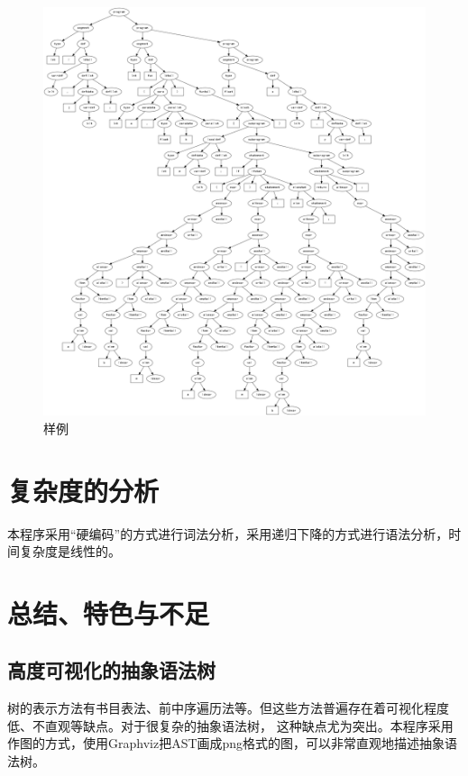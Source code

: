 \documentclass[supercite]{Experimental_Report}
\theoremstyle{definition}
\begin{document}
\newpage
\begin{figure}[htb]
	\begin{center}
		\includegraphics[scale=0.2]{images/样例.png}
		\caption{样例}
		\label{fig3-7}
	\end{center}
\end{figure}
\newpage
\section{复杂度的分析}
本程序采用“硬编码”的方式进行词法分析，采用递归下降的方式进行语法分析，时间复杂度是线性的。

\section{总结、特色与不足}


% 
% 
\subsection{高度可视化的抽象语法树}
树的表示方法有书目表法、前中序遍历法等。但这些方法普遍存在着可视化程度低、不直观等缺点。对于很复杂的抽象语法树，
这种缺点尤为突出。本程序采用作图的方式，使用Graphviz把AST画成png格式的图，可以非常直观地描述抽象语法树。
\end{document}
